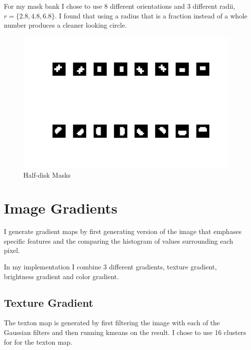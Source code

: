 \documentclass[12pt]{article}
\begin{document}
For my mask bank I chose to use 8 different orientations and 3 different radii, $r = \{2.8, 4.8, 6.8\}$. I found that using a radius that is a fraction instead of a whole number produces a cleaner looking circle.

\begin{figure}
    \includegraphics[width=\linewidth]{img/hdbank}
    \caption{Half-disk Masks}
    \label{fig_hdbank}
\end{figure}


\section{Image Gradients}

I generate gradient maps by first generating version of the image that emphases specific features and the comparing the histogram of values surrounding each pixel.

In my implementation I combine 3 different gradients, texture gradient, brightness gradient and color gradient. 

\subsection{Texture Gradient}

The texton map is generated by first filtering the image with each of the Gaussian filters and then running kmeans on the result. I chose to use 16 clusters for for the texton map.
\end{document}
